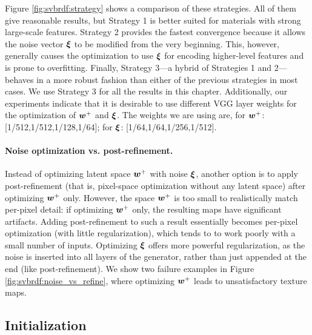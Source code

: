 

Figure \ref{fig:svbrdf:strategy} shows a comparison of these strategies.
All of them give reasonable results, but Strategy 1 is better suited for materials with strong large-scale features.
Strategy 2 provides the fastest convergence because it allows the noise vector $\bm\xi$ to be modified from the very beginning.
This, however, generally causes the optimization to use $\bm\xi$ for encoding higher-level features and is prone to overfitting.
Finally, Strategy 3---a hybrid of Strategies 1 and 2---behaves in a more robust fashion than either of the previous strategies in most cases.
We use Strategy 3 for all the results in this chapter.
Additionally, our experiments indicate that it is desirable to use different VGG layer weights for the optimization of $\bm{w}^+$ and $\bm\xi$. The weights we are using are, for $\bm{w}^+$: [1/512,1/512,1/128,1/64]; for $\bm\xi$: [1/64,1/64,1/256,1/512].




\paragraph{Noise optimization vs. post-refinement.}
\label{ssec:post-refine}
Instead of optimizing latent space $\bm{w}^+$ with noise $\bm\xi$, another option is to apply post-refinement (that is, pixel-space optimization without any latent space) after optimizing $\bm{w}^+$ only. However, the space $\bm{w}^+$ is too small to realistically match per-pixel detail: if optimizing $\bm{w}^+$ only, the resulting maps have significant artifacts. Adding post-refinement to such a result essentially becomes per-pixel optimization (with little regularization), which tends to to work poorly with a small number of inputs. Optimizing $\bm\xi$ offers more powerful regularization, as the noise is inserted into all layers of the generator, rather than just appended at the end (like post-refinement). We show two failure examples in Figure \ref{fig:svbrdf:noise_vs_refine}, where optimizing $\bm{w}^+$ leads to unsatisfactory texture maps.


\subsection{Initialization}
\label{ssec:init}



